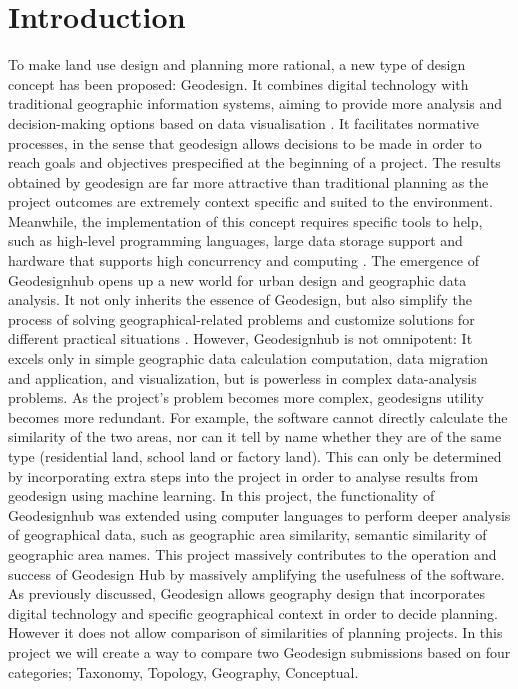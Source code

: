 

\setlength{\baselineskip}{20pt}%
\setlength{\parskip}{5pt}


\section*{Introduction}
To make land use design and planning more rational, a new type of design concept has been proposed: Geodesign. It combines digital technology with traditional geographic information systems, aiming to provide more analysis and decision-making options based on data visualisation \cite{bib1}. It facilitates normative processes, in the sense that geodesign allows decisions to be made in order to reach goals and objectives prespecified at the beginning of a project. The results obtained by geodesign are far more attractive than traditional planning as the project outcomes are extremely context specific and suited to the environment.  Meanwhile, the implementation of this concept requires specific tools to help, such as high-level programming languages, large data storage support and hardware that supports high concurrency and computing \cite{bib2}. The emergence of Geodesignhub opens up a new world for urban design and geographic data analysis. It not only inherits the essence of Geodesign, but also simplify the process of solving geographical-related problems and customize solutions for different practical situations \cite{bib3}. However, Geodesignhub is not omnipotent: It excels only in simple geographic data calculation computation, data migration and application, and visualization, but is powerless in complex data-analysis problems. As the project's problem becomes more complex, geodesigns utility becomes more redundant. For example, the software cannot directly calculate the similarity of the two areas, nor can it tell by name whether they are of the same type (residential land, school land or factory land). This can only be determined by incorporating extra steps into the project in order to analyse results from geodesign using machine learning. In this project, the functionality of Geodesignhub was extended using computer languages to perform deeper analysis of geographical data, such as geographic area similarity, semantic similarity of geographic area names. This project massively contributes to the operation and success of Geodesign Hub by massively amplifying the usefulness of the software. As previously discussed, Geodesign allows geography design that incorporates digital technology and specific geographical context in order to decide planning. However it does not allow comparison of similarities of planning projects. In this project we will create a way to compare two Geodesign submissions based on four categories; Taxonomy, Topology, Geography, Conceptual.   


